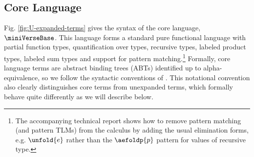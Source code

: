 \documentclass[acmsmall]{acmart}
\begin{document}



\subsection{Core Language}\label{sec:s-XL}
Fig. \ref{fig:U-expanded-terms} gives the syntax of the core language, $\miniVerseBase$. This language forms a standard pure functional language with partial function types, quantification over types, recursive types, labeled product types, labeled sum types and support for pattern matching.\footnote{The accompanying technical report shows how to remove pattern matching  (and pattern TLMs) from the calculus by adding the usual elimination forms, e.g. $\unfold{e}$ rather than the $\aefoldp{p}$ pattern for values of recursive type.} Formally, core language terms are {abstract binding trees} (ABTs) identified up to alpha-equivalence, so we follow the syntactic conventions of \citet{pfple1}. This notational convention also clearly distinguishes core terms from unexpanded terms, which formally behave quite differently as we will describe below. 
\end{document}
